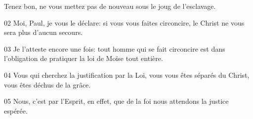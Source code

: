 Tenez bon, ne vous mettez pas de nouveau sous le joug de l’esclavage.

02 Moi, Paul, je vous le déclare: si vous vous faites circoncire, le Christ ne vous sera plus d’aucun secours.

03 Je l’atteste encore une fois: tout homme qui se fait circoncire est dans l’obligation de pratiquer la loi de Moïse tout entière.

04 Vous qui cherchez la justification par la Loi, vous vous êtes séparés du Christ, vous êtes déchus de la grâce.

05 Nous, c’est par l’Esprit, en effet, que de la foi nous attendons la justice espérée.
